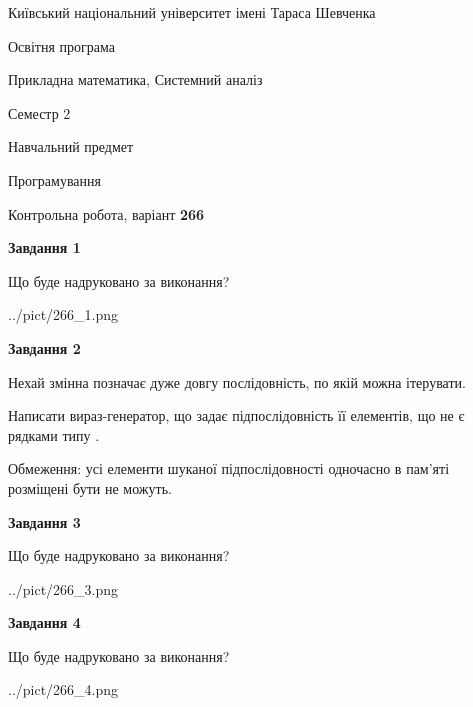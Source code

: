 \documentclass[12pt, ukrainian]{article}
\begin{document}
{{\begin {small}\par
{ \center  Київський національний університет імені Тараса Шевченка \par}
{\parbox {5 cm}{Освітня програма \hfill}{\parbox {8 cm}{Прикладна математика, Системний аналіз \hfill}}\parbox {5 cm}{\hfill Семестр 2}}\par
{\parbox {5 cm} {Навчальний предмет \hfill}\parbox {7 cm}{Програмування \hfill}\parbox {6cm}{\hfill}\par}\vspace{-7pt} \end{small}}{\center Контрольна робота, варіант  \No \textbf
{ 266 }\par}}
{
\begin {large}
{\begin {center}\textbf{Завдання 1}\end {center}}\par
Що буде надруковано за виконання?\par\par
\begin{center}
	{../pict/266_1.png}
\end{center}
\newpage

{\begin {center}\textbf{Завдання 2}\end {center}}\par
Нехай змінна  позначає дуже довгу послідовність, по якій можна ітерувати.

Написати вираз-генератор, що задає підпослідовність її елементів, що не є рядками типу .

Обмеження: усі елементи шуканої підпослідовності одночасно в пам'яті розміщені бути не можуть.\par
\newpage

{\begin {center}\textbf{Завдання 3}\end {center}}\par
Що буде надруковано за виконання?
\begin{center}
	{../pict/266_3.png}
\end{center}
\newpage

{\begin {center}\textbf{Завдання 4}\end {center}}\par
Що буде надруковано за виконання?\par
\begin{center}
	{../pict/266_4.png}
\end{center}
\newpage


\end{large}}
\end{document}
